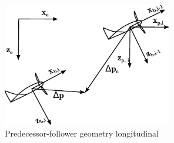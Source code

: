 \documentclass{ifacconf}
\begin{document}
\begin{figure}
\begin{center}
\includegraphics[width=7.4cm]{frames.pdf}    %
\caption{Predecessor-follower geometry longitudinal}
\label{fig:frames}
\end{center}
\end{figure}
\end{document}
